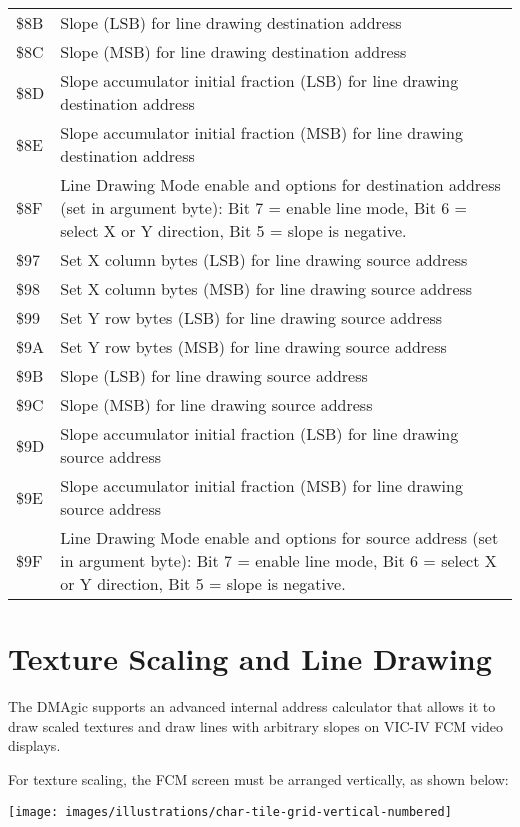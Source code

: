 \begin{center}
\begin{tabular}{|>{\centering\arraybackslash}p{1.5cm}|p{10cm}|}
  \$8B & Slope (LSB) for line drawing destination address \\
  \$8C & Slope (MSB) for line drawing destination address \\
  \$8D & Slope accumulator initial fraction (LSB) for line drawing destination address \\
  \$8E & Slope accumulator initial fraction (MSB) for line drawing destination address \\
  \$8F & Line Drawing Mode enable and options for destination address (set in argument byte): Bit 7 = enable line mode, Bit 6 = select X or Y direction, Bit 5 = slope is negative. \\
  \$97 & Set X column bytes (LSB) for line drawing source address \\
  \$98 & Set X column bytes (MSB) for line drawing source address \\
  \$99 & Set Y row bytes (LSB) for line drawing source address \\
  \$9A & Set Y row bytes (MSB) for line drawing source address \\
  \$9B & Slope (LSB) for line drawing source address \\
  \$9C & Slope (MSB) for line drawing source address \\
  \$9D & Slope accumulator initial fraction (LSB) for line drawing source address \\
  \$9E & Slope accumulator initial fraction (MSB) for line drawing source address \\
  \$9F & Line Drawing Mode enable and options for source address (set in argument byte): Bit 7 = enable line mode, Bit 6 = select X or Y direction, Bit 5 = slope is negative. \\
  
  \hline
\end{tabular}
\end{center}

\section{Texture Scaling and Line Drawing}

The DMAgic supports an advanced internal address calculator that allows it to draw scaled textures and draw
lines with arbitrary slopes on VIC-IV FCM video displays.

For texture scaling, the FCM screen must be arranged
vertically, as shown below:

\begin{center}
\texttt{[image: images/illustrations/char-tile-grid-vertical-numbered]}
\end{center}

